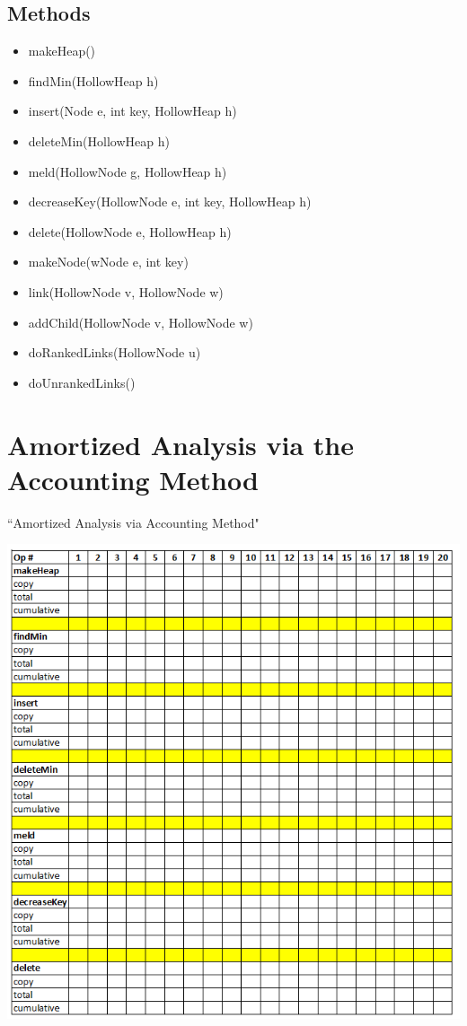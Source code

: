 \documentclass[letter,10pt]{article}
\begin{document}
\subsection{Methods}
\begin{itemize}
	\item makeHeap()
	\item findMin(HollowHeap h)
	\item insert(Node e, int key, HollowHeap h)	
	\item deleteMin(HollowHeap h)
	\item meld(HollowNode g, HollowHeap h)	
	\item decreaseKey(HollowNode e, int key, HollowHeap h)
	\item delete(HollowNode e, HollowHeap h)
	\item makeNode(wNode e, int key)
	\item link(HollowNode v, HollowNode w)
	\item addChild(HollowNode v, HollowNode w)	
	\item doRankedLinks(HollowNode u)
	\item doUnrankedLinks()
	
\end{itemize} 

\section{Amortized Analysis via the Accounting Method}
``Amortized Analysis via Accounting Method"
\begin{center}
	\includegraphics[width=\textwidth,height=\textheight]{accounting.png}
\end{center}
\end{document}
